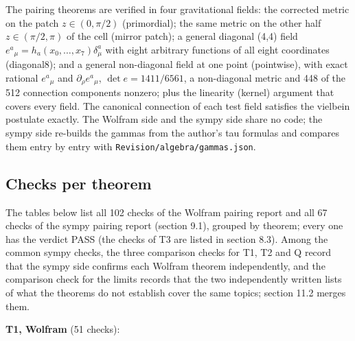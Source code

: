 \documentclass[11pt]{article}
\begin{document}
The pairing theorems are verified in four gravitational fields: the corrected metric on the patch $z \in (0,\pi/2)$ (primordial); the same metric on the other half $z \in (\pi/2,\pi)$ of the cell (mirror patch); a general diagonal (4,4) field $e^a{}_\mu = h_a(x_0,\dots,x_7)\delta^a_\mu$ with eight arbitrary functions of all eight coordinates (diagonal8); and a general non-diagonal field at one point (pointwise), with exact rational $e^a{}_\mu$ and $\partial_\rho e^a{}_\mu$, $\det e = 1411/6561$, a non-diagonal metric and 448 of the 512 connection components nonzero; plus the linearity (kernel) argument that covers every field. The canonical connection of each test field satisfies the vielbein postulate exactly. The Wolfram side and the sympy side share no code; the sympy side re-builds the gammas from the author's tau formulas and compares them entry by entry with \texttt{Revision\allowbreak{}/algebra\allowbreak{}/gammas.\allowbreak{}json}.

\subsection{Checks per theorem}

The tables below list all 102 checks of the Wolfram pairing report and all 67 checks of the sympy pairing report (section 9.1), grouped by theorem; every one has the verdict PASS (the checks of T3 are listed in section 8.3). Among the common sympy checks, the three comparison checks for T1, T2 and Q record that the sympy side confirms each Wolfram theorem independently, and the comparison check for the limits records that the two independently written lists of what the theorems do not establish cover the same topics; section 11.2 merges them.

\textbf{T1, Wolfram} (51 checks):
\end{document}
